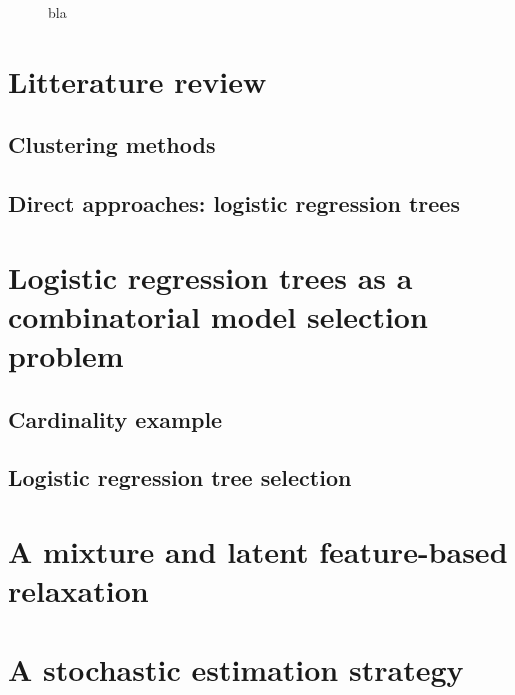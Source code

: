 \begin{figure}
\caption{\label{fig:ydiff} bla}
\end{figure}








\section{Litterature review} \label{sec:literature}


\subsection{Clustering methods}


\subsection{Direct approaches: logistic regression trees}



\section{Logistic regression trees as a combinatorial model selection problem} \label{sec:model_selec_tree}


\subsection{Cardinality example}


\subsection{Logistic regression tree selection}



\section{A mixture and latent feature-based relaxation}




\section{A stochastic estimation strategy}


